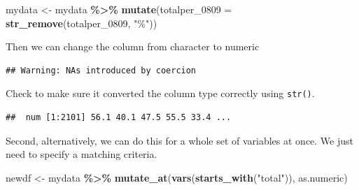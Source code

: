 \documentclass[
]{book}
\newenvironment{Shaded}{\begin{snugshade}}{\end{snugshade}}
\newcommand{\DataTypeTok}[1]{\textcolor[rgb]{0.13,0.29,0.53}{#1}}
\newcommand{\DecValTok}[1]{\textcolor[rgb]{0.00,0.00,0.81}{#1}}
\newcommand{\KeywordTok}[1]{\textcolor[rgb]{0.13,0.29,0.53}{\textbf{#1}}}
\newcommand{\NormalTok}[1]{#1}
\newcommand{\OperatorTok}[1]{\textcolor[rgb]{0.81,0.36,0.00}{\textbf{#1}}}
\newcommand{\StringTok}[1]{\textcolor[rgb]{0.31,0.60,0.02}{#1}}
\begin{document}
\begin{Shaded}
\begin{Highlighting}[]
\NormalTok{mydata \textless{}{-}}\StringTok{ }\NormalTok{mydata }\OperatorTok{\%\textgreater{}\%}
\StringTok{  }\KeywordTok{mutate}\NormalTok{(}\DataTypeTok{totalper\_0809 =} \KeywordTok{str\_remove}\NormalTok{(totalper\_}\DecValTok{0809}\NormalTok{, }\StringTok{"\%"}\NormalTok{))}
\end{Highlighting}
\end{Shaded}

Then we can change the column from character to numeric

\begin{Shaded}
\end{Shaded}

\begin{verbatim}
## Warning: NAs introduced by coercion
\end{verbatim}

Check to make sure it converted the column type correctly using \texttt{str()}.

\begin{Shaded}
\end{Shaded}

\begin{verbatim}
##  num [1:2101] 56.1 40.1 47.5 55.5 33.4 ...
\end{verbatim}

Second, alternatively, we can do this for a whole set of variables at once. We just need to specify a matching criteria.

\begin{Shaded}
\begin{Highlighting}[]
\NormalTok{newdf \textless{}{-}}\StringTok{ }\NormalTok{mydata }\OperatorTok{\%\textgreater{}\%}\StringTok{ }
\StringTok{  }\KeywordTok{mutate\_at}\NormalTok{(}\KeywordTok{vars}\NormalTok{(}\KeywordTok{starts\_with}\NormalTok{(}\StringTok{"total"}\NormalTok{)), as.numeric)}
\end{Highlighting}
\end{Shaded}
\end{document}
